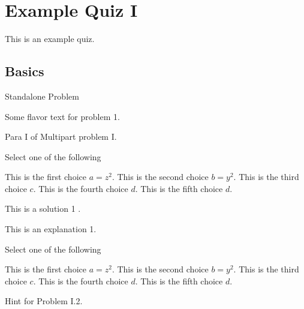\chapter{Example Quiz I}
\label{ch:quiz-ii}

\begin{preamble}
This is an example quiz.
\end{preamble}

\newpage
\section{Basics}

\begin{problem}
Standalone Problem
\end{problem}

\begin{mproblem}
\label{cl:quiz-ii::1}

\begin{gram}
Some flavor text for problem 1.
\end{gram}

\begin{gram}
\label{quiz-ii::1::1}
Para I of Multipart problem I.
\end{gram}

\begin{problem}[20][Problem I.1]
Select one of the following
\begin{xchoice}
\choice This is the first choice $a = z^2$.
\choice This is the second choice $b = y^2$.
\choice This is the third choice $c$.
\choice* This is the fourth choice $d$.
\choice This is the fifth choice $d$.
\end{xchoice}

\solution
This is a solution 1 .

\explain
This is an explanation 1.

\end{problem}


\begin{problem}[20][Problem I.2]
Select one of the following
\begin{xchoice}
\choice This is the first choice $a = z^2$.
\choice This is the second choice $b = y^2$.
\choice* This is the third choice $c$.
\choice* This is the fourth choice $d$.
\choice This is the fifth choice $d$.
\end{xchoice}


\help 
Hint  for Problem I.2.


\end{problem}
\end{mproblem}
